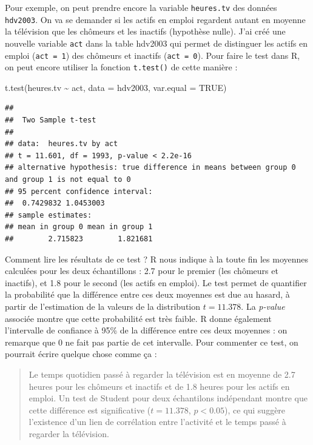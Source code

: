 \documentclass[
  french,
]{book}
\newenvironment{Shaded}{\begin{snugshade}}{\end{snugshade}}
\newcommand{\AttributeTok}[1]{\textcolor[rgb]{0.77,0.63,0.00}{#1}}
\newcommand{\ConstantTok}[1]{\textcolor[rgb]{0.00,0.00,0.00}{#1}}
\newcommand{\FunctionTok}[1]{\textcolor[rgb]{0.00,0.00,0.00}{#1}}
\newcommand{\NormalTok}[1]{#1}
\newcommand{\SpecialCharTok}[1]{\textcolor[rgb]{0.00,0.00,0.00}{#1}}
\begin{document}
Pour exemple, on peut prendre encore la variable \texttt{heures.tv} des données \texttt{hdv2003}. On va se demander si les actifs en emploi regardent autant en moyenne la télévision que les chômeurs et les inactifs (hypothèse nulle). J'ai créé une nouvelle variable \texttt{act} dans la table hdv2003 qui permet de distinguer les actifs en emploi (\texttt{act\ =\ 1}) des chômeurs et inactifs (\texttt{act\ =\ 0}). Pour faire le test dans R, on peut encore utiliser la fonction \texttt{t.test()} de cette manière :

\begin{Shaded}
\begin{Highlighting}[]
\FunctionTok{t.test}\NormalTok{(heures.tv }\SpecialCharTok{\textasciitilde{}}\NormalTok{ act, }\AttributeTok{data =}\NormalTok{ hdv2003, }\AttributeTok{var.equal =} \ConstantTok{TRUE}\NormalTok{)}
\end{Highlighting}
\end{Shaded}

\begin{verbatim}
## 
##  Two Sample t-test
## 
## data:  heures.tv by act
## t = 11.601, df = 1993, p-value < 2.2e-16
## alternative hypothesis: true difference in means between group 0 and group 1 is not equal to 0
## 95 percent confidence interval:
##  0.7429832 1.0453003
## sample estimates:
## mean in group 0 mean in group 1 
##        2.715823        1.821681
\end{verbatim}

Comment lire les résultats de ce test ? R nous indique à la toute fin les moyennes calculées pour les deux échantillons : 2.7 pour le premier (les chômeurs et inactifs), et 1.8 pour le second (les actifs en emploi). Le test permet de quantifier la probabilité que la différence entre ces deux moyennes est due au hasard, à partir de l'estimation de la valeurs de la distribution \(t = 11.378\). La \emph{p-value} associée montre que cette probabilité est très faible. R donne également l'intervalle de confiance à 95\% de la différence entre ces deux moyennes : on remarque que 0 ne fait pas partie de cet intervalle. Pour commenter ce test, on pourrait écrire quelque chose comme ça :

\begin{quote}
Le temps quotidien passé à regarder la télévision est en moyenne de 2.7 heures pour les chômeurs et inactifs et de 1.8 heures pour les actifs en emploi. Un test de Student pour deux échantilons indépendant montre que cette différence est significative (\(t = 11.378\), \(p < 0.05\)), ce qui suggère l'existence d'un lien de corrélation entre l'activité et le temps passé à regarder la télévision.
\end{quote}
\end{document}

